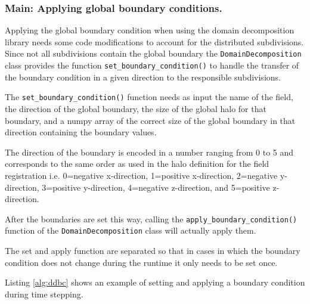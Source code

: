 \subsubsection{Main: Applying global boundary conditions.}
Applying the global boundary condition when using the domain decomposition library needs some code modifications to account for the distributed subdivisions.
Since not all subdivisions contain the global boundary the \texttt{DomainDecomposition} class provides the function \texttt{set\_boundary\_condition()} to handle the transfer of the boundary condition in a given direction to the responsible subdivisions.

The \texttt{set\_boundary\_condition()} function needs as input the name of the field, the direction of the global boundary, the size of the global halo for that boundary, and a numpy array of the correct size of the global boundary in that direction containing the boundary values.

The direction of the boundary is encoded in a number ranging from 0 to 5 and corresponds to the same order as used in the halo definition for the field registration i.e. 0=negative x-direction, 1=positive x-direction, 2=negative y-direction, 3=positive y-direction, 4=negative z-direction, and 5=positive z-direction.

After the boundaries are set this way, calling the \texttt{apply\_boundary\_condition()} function of the \texttt{DomainDecomposition} class will actually apply them.

The set and apply function are separated so that in cases in which the boundary condition does not change during the runtime it only needs to be set once.

Listing \ref{alg:ddbc} shows an example of setting and applying a boundary condition during time stepping.

